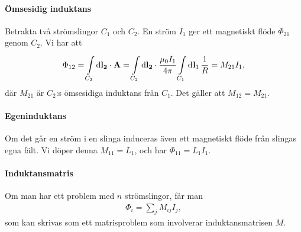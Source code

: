 \paragraph{Ömsesidig induktans}
Betrakta två strömslingor $C_{1}$ och $C_{2}$. En ström $I_{1}$ ger ett magnetiskt flöde $\Phi_{21}$ genom $C_{2}$. Vi har att
\begin{align*}
	\Phi_{12} = \int\limits_{C_{2}}^{}\dd{\vb{l_{2}}}\cdot \vb{A} = \int\limits_{C_{2}}^{}\dd{\vb{l_{2}}}\cdot \frac{\mu_{0}I_{1}}{4\pi}\int\limits_{C_{1}}^{}\dd[]{\vb{l}_{1}}\frac{1}{R} = M_{21}I_{1},
\end{align*}
där $M_{21}$ är $C_{2}$:s ömsesidiga induktans från $C_{1}$. Det gäller att $M_{12} = M_{21}$.

\paragraph{Egeninduktans}
Om det går en ström i en slinga induceras även ett magnetiskt flöde från slingas egna fält. Vi döper denna $M_{11} = L_{1}$, och har $\Phi_{11} = L_{1}I_{1}$.

\paragraph{Induktansmatris}
Om man har ett problem med $n$ strömslingor, får man
\begin{align*}
	\Phi_{i} = \sum\limits_{j}M_{ij}I_{j},
\end{align*}
som kan skrivas som ett matrisproblem som involverar induktansmatrisen $M$.